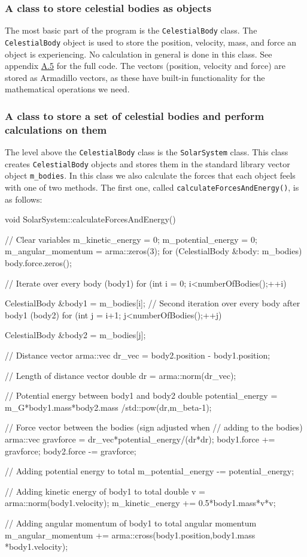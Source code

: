 \documentclass[reprint,english,notitlepage]{revtex4-1}  %
\begin{document}
\subsubsection{A class to store celestial bodies as objects} \label{sec:III:a:1}

The most basic part of the program is the \verb+CelestialBody+ class. The \verb+CelestialBody+ object is used to store the position, velocity, mass, and force an object is experiencing. No calculation in general is done in this class. See appendix \hyperref[A.5]{A.5} for the full code. The vectors (position, velocity and force) are stored as Armadillo \citep{Armadillo} vectors, as these have built-in functionality for the mathematical operations we need.

\subsubsection{A class to store a set of celestial bodies and perform calculations on them} \label{sec:III:a:2}

The level above the \verb+CelestialBody+ class is the \verb+SolarSystem+ class. This class creates \verb+CelestialBody+ objects and stores them in the standard library vector object \verb+m_bodies+. In this class we also calculate the forces that each object feels with one of two methods. The first one, called \verb+calculateForcesAndEnergy()+, is as follows:

\begin{cpp}
void SolarSystem::calculateForcesAndEnergy() {
  // Clear variables
  m_kinetic_energy = 0;
  m_potential_energy = 0;
  m_angular_momentum = arma::zeros(3);
  for (CelestialBody &body: m_bodies) {
    body.force.zeros();
  }

  // Iterate over every body (body1)
  for (int i = 0; i<numberOfBodies();++i){
    CelestialBody &body1 = m_bodies[i];
    // Second iteration over every body after body1 (body2)
    for (int j = i+1; j<numberOfBodies();++j) {
      CelestialBody &body2 = m_bodies[j];

      // Distance vector
      arma::vec dr_vec = body2.position - body1.position;

      // Length of distance vector
      double dr = arma::norm(dr_vec);

      // Potential energy between body1 and body2
      double potential_energy = m_G*body1.mass*body2.mass
      							/std::pow(dr,m_beta-1);

      // Force vector between the bodies (sign adjusted when 
      // adding to the bodies)
      arma::vec gravforce = dr_vec*potential_energy/(dr*dr);
      body1.force += gravforce;
      body2.force -= gravforce;

      // Adding potential energy to total
      m_potential_energy -= potential_energy;
    }

    // Adding kinetic energy of body1 to total
    double v = arma::norm(body1.velocity);
    m_kinetic_energy += 0.5*body1.mass*v*v;

    // Adding angular momentum of body1 to total angular momentum
    m_angular_momentum += arma::cross(body1.position,body1.mass
    								  *body1.velocity);
  }
}
\end{cpp}
\end{document}

